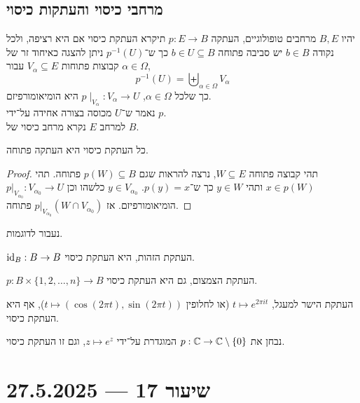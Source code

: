 \subsection{מרחבי כיסוי והעתקות כיסוי}
\begin{definition}
	יהיו $B, E$ מרחבים טופולוגיים,
	העתקה $p : E \to B$ תיקרא העתקת כיסוי אם היא רציפה,
	ולכל נקודה $b \in B$ יש סביבה פתוחה $b \in U \subseteq B$ כך ש־$p^{-1}(U)$ ניתן להצגה כאיחוד זר של קבוצות פתוחות $V_{\alpha} \subseteq E$ עבור $\alpha \in \Omega$,
	\[
		p^{-1}(U)
		= \biguplus_{\alpha \in \Omega} V_{\alpha}
	\]
	כך שלכל $\alpha \in \Omega$, $p \mid_{V_{\alpha}} : V_{\alpha} \to U$ היא הומיאומורפיזם. \\
	נאמר ש־$U$ מכוסה בצורה אחידה על־ידי $p$. \\
	למרחב $E$ נקרא מרחב כיסוי של $B$.
\end{definition}
\begin{proposition}
	כל העתקת כיסוי היא העתקה פתוחה.
\end{proposition}
\begin{proof}
	תהי קבוצה פתוחה $W \subseteq E$, נרצה להראות שגם $p(W) \subseteq B$ פתוחה.
	תהי $x \in p(W)$ ותהי $y \in W$ כך ש־$p(y) = x$.
	$y \in V_{\alpha_0}$ כלשהו וכן $p |_{V_{\alpha_0}} : V_{\alpha_0} \to U$ הומיאומורפיזם.
	אז $p |_{V_{\alpha_0}}(W \cap V_{\alpha_0})$ פתוחה.
\end{proof}
נעבור לדוגמות.
\begin{example}
	$\operatorname{id}_B : B \to B$ העתקת הזהות, היא העתקת כיסוי.
\end{example}
\begin{example}
	$p : B \times \{ 1, 2, \ldots, n \} \to B$ העתקת הצמצום, גם היא העתקת כיסוי.
\end{example}
\begin{example}
	העתקת הישר למעגל, $t \mapsto e^{2 \pi i t}$ (או לחלופין $t \mapsto (\cos(2\pi t), \sin(2\pi t))$), אף היא העתקת כיסוי.
\end{example}
\begin{example}
	נבחן את $p : \mathbb{C} \to \mathbb{C} \setminus \{ 0 \}$ המוגדרת על־ידי $z \mapsto e^z$, וגם זו העתקת כיסוי.
\end{example}

\section{שיעור 17 --- 27.5.2025}
